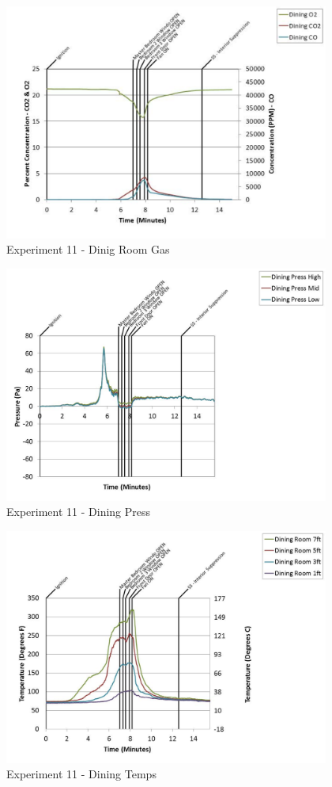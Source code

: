 \documentclass{article}
\begin{document}
\begin{appendices}
	\clearpage

	\begin{figure}[h!]
		\centering
		\includegraphics[height=3.05in]{0_Images/Results_Charts/Exp_11_Charts/DinigRoomGas.pdf}
		\caption{Experiment 11 - Dinig Room Gas}
	\end{figure}
 

	\begin{figure}[h!]
		\centering
		\includegraphics[height=3.05in]{0_Images/Results_Charts/Exp_11_Charts/DiningPress.pdf}
		\caption{Experiment 11 - Dining Press}
	\end{figure}
 
	\clearpage

	\begin{figure}[h!]
		\centering
		\includegraphics[height=3.05in]{0_Images/Results_Charts/Exp_11_Charts/DiningTemps.pdf}
		\caption{Experiment 11 - Dining Temps}
	\end{figure}
 


\end{appendices}
\end{document}
